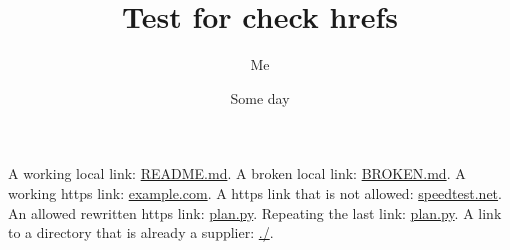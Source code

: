 \documentclass{article}
\title{Test for check hrefs}
\author{Me}
\date{Some day}
\begin{document}
    \maketitle
    A working local link: \href{README.md}{README.md}.
    A broken local link: \href{BROKEN.md}{BROKEN.md}.
    A working https link: \href{https://www.iana.org/help/example-domains}{example.com}.
    A https link that is not allowed: \href{https://www.speedtest.net/}{speedtest.net}.
    An allowed rewritten https link: \href{https://users.ugent.be/~tovrstra/plan.py}{plan.py}.
    Repeating the last link: \href{https://users.ugent.be/~tovrstra/plan.py}{plan.py}.
    A link to a directory that is already a supplier: \href{https://users.ugent.be/~tovrstra/}{./}.
\end{document}
